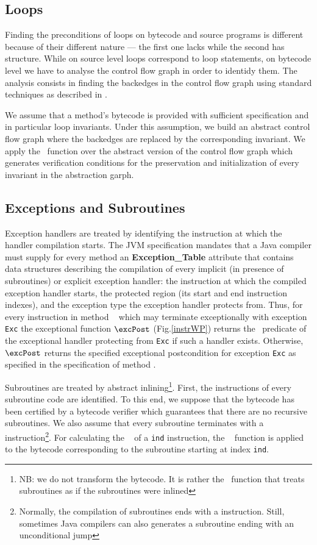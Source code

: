 \subsection{Loops}
Finding the preconditions of loops on bytecode and source programs is different because of their different nature --- 
the first one lacks while the second has structure. While on source level loops correspond to loop statements,  
on bytecode level we have to analyse the control flow graph in order to identidy them.
 The analysis consists in finding the backedges in the control flow graph using standard techniques as described in \cite{ARUCom1986}. 
  
 We assume that a method's bytecode is provided with sufficient specification and in particular loop invariants.
 Under this assumption, we build an abstract control flow graph where the backedges are replaced by
 the corresponding invariant. We apply the \wpi \ function over the abstract version of the control flow graph which generates verification conditions for the 
preservation and initialization of every invariant in the abstraction garph. 


     
\subsection{Exceptions and Subroutines}

Exception handlers are treated by identifying the instruction at which the handler compilation starts. The JVM specification mandates 
that a Java compiler must supply for every method an \textbf{Exception\_Table} attribute that contains data structures describing the compilation of
 every implicit (in presence of subroutines) or explicit exception handler: the instruction at which the compiled exception handler starts,
 the protected region (its start and end instruction indexes), and the exception type the exception handler protects from. Thus, 
for every instruction  in method \method~ which may terminate exceptionally with exception \texttt{Exc} the exceptional function
 $\excPost$ (Fig.\ref{instrWP}) returns the \wpi \ predicate of the exceptional handler protecting  from \texttt{Exc} if such a handler exists.
Otherwise, $\excPost$ returns the specified exceptional postcondition for exception \texttt{Exc}  as specified in the specification of method \method.

Subroutines are treated by abstract inlining\footnote{NB: we do not transform the bytecode. It is rather the \wpi \
 function that treats subroutines as if the subroutines were inlined}. First, the instructions of every subroutine code
 are identified. To this end, we suppose that the bytecode has
 been certified by a bytecode verifier which guarantees
that there are no recursive subroutines. We also assume that every subroutine terminates with a  
instruction\footnote{Normally, the compilation of subroutines ends with a \instr{ret} instruction. Still, sometimes Java 
compilers can also generates a subroutine ending with an unconditional jump}. For calculating the \wpi~ of a
\instr{jsr}  \texttt{ind} instruction, the \wpi~ function is applied to the bytecode corresponding to
 the subroutine starting at index \texttt{ind}. 


